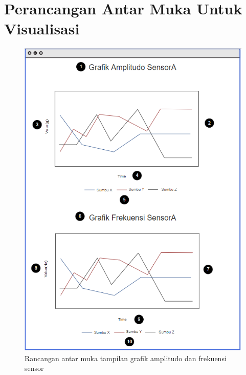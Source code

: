 \section{Perancangan Antar Muka Untuk Visualisasi}
\begin{figure}[H] 
	\centering  
	\includegraphics[scale=1]{Gambar/tampilanData.PNG}
	\caption[Rancangan antar muka tampilan grafik amplitudo dan frekuensi sensor]{Rancangan antar muka tampilan grafik amplitudo dan frekuensi sensor}
	\label{fig:tampilandata} 
\end{figure}

